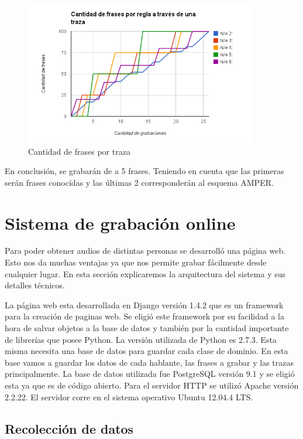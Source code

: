 \documentclass[11pt,a4paper,twoside]{tesis}
\begin{document}
\begin{figure}[h!]
    \centerline{\includegraphics[width=0.9\textwidth]{cant_frases_traza_inf} }
    \caption{Cantidad de frases por traza}
    \label{figFracesTraza}
\end{figure}

En conclusión, se grabarán de a 5 frases. Teniendo en cuenta que las primeras serán frases conocídas y las últimas 2 corresponderán al esquema AMPER. 

\chapter{Sistema de grabación online}

Para poder obtener audios de distintas personas se desarrolló una página web. Esto nos da muchas ventajas ya que nos permite grabar fácilmente desde cualquier lugar. En esta sección explicaremos la arquitectura del sistema y sus detalles técnicos.

La página web esta desarrollada en Django versión 1.4.2 que es un framework para la creación de paginas web. Se eligió este framework por su facilidad a la hora de salvar objetos a la base de datos y también por la cantidad importante de librerías que posee Python. La versión utilizada de Python es 2.7.3. Esta misma necesita una base de datos para guardar cada clase de dominio. En esta base vamos a guardar los datos de cada hablante, las frases a grabar y las trazas principalmente. La base de datos utilizada fue PostgreSQL versión 9.1 y se eligió esta ya que es de código abierto. Para el servidor HTTP se utilizó Apache versión 2.2.22. El servidor corre en el sistema operativo Ubuntu 12.04.4 LTS.

\section{Recolección de datos}
\end{document}
